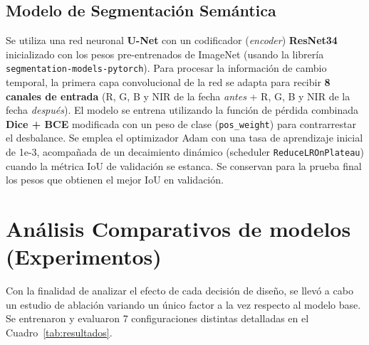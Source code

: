 \documentclass{article}
\begin{document}
\subsection*{Modelo de Segmentación Semántica}
Se utiliza una red neuronal \textbf{U-Net} con un codificador (\textit{encoder}) \textbf{ResNet34} inicializado con los pesos pre-entrenados de ImageNet (usando la librería \texttt{segmentation-models-pytorch}). Para procesar la información de cambio temporal, la primera capa convolucional de la red se adapta para recibir \textbf{8 canales de entrada} (R, G, B y NIR de la fecha \textit{antes} + R, G, B y NIR de la fecha \textit{después}). 
El modelo se entrena utilizando la función de pérdida combinada \textbf{Dice + BCE} modificada con un peso de clase (\texttt{pos\_weight}) para contrarrestar el desbalance. Se emplea el optimizador Adam con una tasa de aprendizaje inicial de 1e-3, acompañada de un decaimiento dinámico (scheduler \texttt{ReduceLROnPlateau}) cuando la métrica IoU de validación se estanca. Se conservan para la prueba final los pesos que obtienen el mejor IoU en validación.

\section{Análisis Comparativos de modelos (Experimentos)}
Con la finalidad de analizar el efecto de cada decisión de diseño, se llevó a cabo un estudio de ablación variando un único factor a la vez respecto al modelo base. Se entrenaron y evaluaron 7 configuraciones distintas detalladas en el Cuadro~\ref{tab:resultados}.
\end{document}
